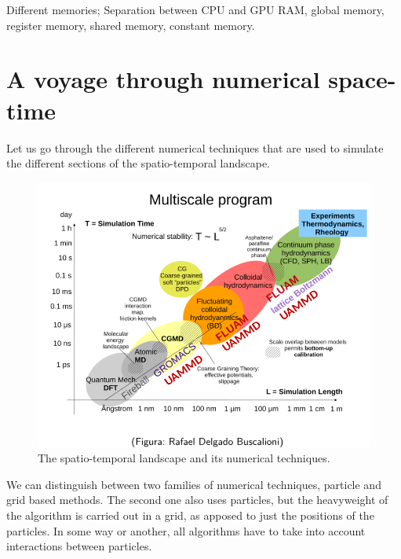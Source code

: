 \documentclass[ twoside,openright,titlepage,numbers=noenddot,%
headinclude,footinclude,cleardoublepage=empty,abstract=on,
BCOR=5mm,paper=a4,fontsize=11pt, dvipsnames
]{scrreprt}
\begin{document}
Different memories; Separation between CPU and GPU RAM, global memory, register memory, shared memory, constant memory.

\part{A voyage through numerical space-time}

Let us go through the different numerical techniques that are used to simulate the different sections of the spatio-temporal landscape.

\begin{figure}
  \centering
  \includegraphics[width=\textwidth]{landscape}
  \caption{The spatio-temporal landscape and its numerical techniques.}
  \label{fig:sptime-land}
\end{figure}

We can distinguish between two families of numerical techniques, particle and grid based methods. The second one also uses particles, but the heavyweight of the algorithm is carried out in a grid, as apposed to just the positions of the particles.
In some way or another, all algorithms have to take into account interactions between particles.
\end{document}
